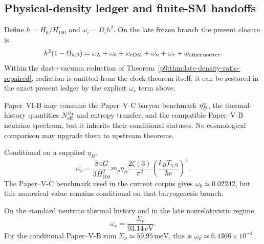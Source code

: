 \documentclass[12pt,a4paper]{article}
\begin{document}
\subsection{Physical-density ledger and finite-SM handoffs}
\label{p9:sec:exact-density-closure}
Define \(h=H_0/H_{100}\) and \(\omega_i=\Omega_i h^2\).  On the late frozen
branch the present closure is
\begin{equation}
\label{p9:eq:density-closure}
h^2(1-\Omega_{k,0})
=\omega_\Lambda+\omega_b+\omega_{\rm cDM}
 +\omega_\nu+\omega_r+\omega_{\rm other\,matter}.
\end{equation}
Within the dust+vacuum reduction of
Theorem~\ref{p9:thm:late-density-ratio-repaired}, radiation is omitted from the
clock theorem itself; it can be restored in the exact present ledger by the
explicit \(\omega_r\) term above.

\begin{definition}
\label{p9:def:imported-finite-sm-cosmology-boundary}
Paper~VI-B may consume the Paper--V-C baryon benchmark \(\eta_B^{\rm tr}\), the
thermal-history quantities \(N_{\rm eff}^{\rm th}\) and entropy transfer, and
the compatible Paper--V-B neutrino spectrum, but it inherits their conditional
statuses.  No cosmological comparison may upgrade them to upstream theorems.
\end{definition}

Conditional on a supplied \(\eta_B\),
\begin{equation}
\label{p9:eq:omega-b-from-eta}
\omega_b=\frac{8\pi G}{3H_{100}^2}
 m_p\eta_B\frac{2\zeta(3)}{\pi^2}
 \left(\frac{k_BT_{\gamma,0}}{\hbar c}\right)^3.
\end{equation}
The Paper--V-C benchmark used in the current corpus gives
\(\omega_b\simeq0.02242\), but this numerical value remains conditional on
that baryogenesis branch.

On the standard neutrino thermal history and in the late nonrelativistic
regime,
\begin{equation}
\label{p9:eq:omega-nu-handoff}
\omega_\nu=\frac{\Sigma_\nu}{93.14\,\mathrm{eV}}.
\end{equation}
For the conditional Paper--V-B sum \(\Sigma_\nu\simeq59.95\,\mathrm{meV}\),
this is \(\omega_\nu\simeq6.4366\times10^{-4}\).
\end{document}
